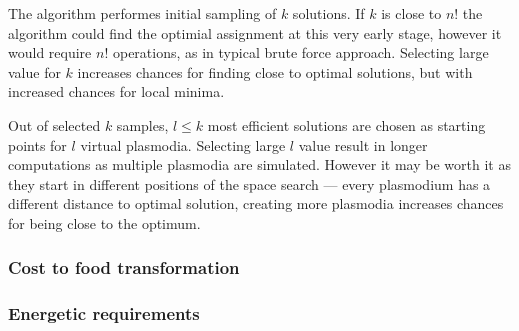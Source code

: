 The algorithm performes initial sampling of $k$ solutions. If $k$ is close to $n!$ the algorithm could find the optimial assignment at this very early stage, however it would require $n!$ operations, as in typical brute force approach. Selecting large value for $k$ increases chances for finding close to optimal solutions, but with increased chances for local minima.

Out of selected $k$ samples, $l \leq k$ most efficient solutions are chosen as starting points for $l$ virtual plasmodia. Selecting large $l$ value result in longer computations as multiple plasmodia are simulated. However it may be worth it as they start in different positions of the space search --- every plasmodium has a different distance to optimal solution, creating more plasmodia increases chances for being close to the optimum.


\subsubsection{Cost to food transformation}


\subsubsection{Energetic requirements}




